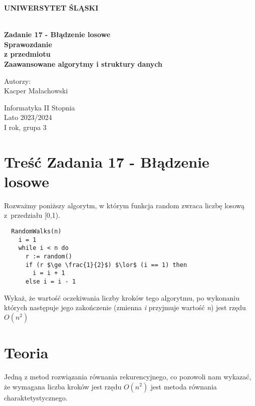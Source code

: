 \documentclass[12pt,oneside,a4paper]{book} %
\theoremstyle{break}
\begin{document}
\thispagestyle{empty}
\begin{center}
  \Large
  \bf{UNIWERSYTET ŚLĄSKI}\\
  \bf{}\\[25mm]
  \large

  \bf{Zadanie 17 - Błądzenie losowe}\\[35mm]

  Sprawozdanie\\
  z przedmiotu\\
  Zaawansowane algorytmy i struktury danych\\[25mm]
\end{center}
\begin{flushright}
  \large
  Autorzy:\\
  Kacper Małachowski\\
\end{flushright}
\vspace*{\fill}
\begin{center}
  Informatyka II Stopnia\\
  Lato 2023/2024\\
  I rok, grupa 3\\[25mm]
\end{center}

\chapter*{Treść Zadania 17 - Błądzenie losowe}

Rozważmy poniższy algorytm, w którym funkcja random zwraca liczbę losową z~przedziału [0,1).
\begin{lstlisting}
  RandomWalks(n)
    i = 1
    while i < n do
      r := random()
      if (r $\ge \frac{1}{2}$) $\lor$ (i == 1) then
        i = i + 1
      else i = i - 1
\end{lstlisting}

Wykaż, że wartość oczekiwania liczby kroków tego algorytmu, po wykonaniu których następuje jego zakończenie (zmienna \textit{i} przyjmuje wartość \textit{n}) jest rzędu \textit{$O(n^2)$}

\chapter*{Teoria}

Jedną z metod rozwiązania równania rekurencyjnego, co pozowoli nam wykazać, że wymagana liczba kroków jest rzędu $O(n^2)$ jest metoda równania charaktetystycznego.
\end{document}
